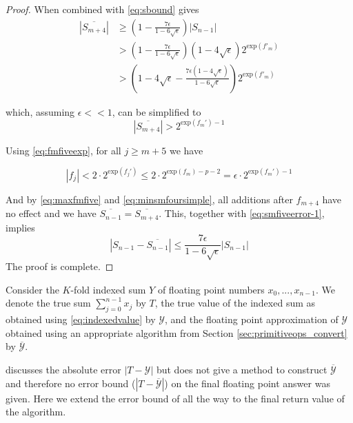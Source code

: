 \documentclass[12pt]{article}
\providecommand{\exp}{\ensuremath{\text{exp}}}
\theoremstyle{definition}
\numberwithin{equation}{section}
\numberwithin{figure}{section}
\begin{document}
\begin{proof}
      When combined with \eqref{eq:sbound} gives
      \begin{align*}
        \left|\overline{S_{m+4}}\right|
        & \geq \left(1-\frac{7 \epsilon}{1-6\sqrt{\epsilon}}\right) |S_{n-1}| \\
        & > \left(1-\frac{7 \epsilon}{1-6\sqrt{\epsilon}}\right) \left(1-4\sqrt{\epsilon}\right) 2^{\exp(f'_m)} \\
        & > \left(1-4\sqrt{\epsilon} - \frac{7 \epsilon \left(1-4\sqrt{\epsilon}\right)}{1-6\sqrt{\epsilon}}\right) 2^{\exp(f'_m)}
      \end{align*}

      which, assuming $\epsilon << 1$, can be simplified to
      \begin{equation}
        \left|\overline{S_{m + 4}}\right| > 2^{\exp(f_m') - 1}
        \label{eq:minsmfoursimple}
      \end{equation}

      Using  \eqref{eq:fmfiveexp}, for all $j \geq m + 5$ we have

      \begin{equation}
        |f_j| < 2 \cdot 2^{\exp(f_j')} \leq 2 \cdot 2^{\exp(f_m) - p - 2} = \epsilon \cdot 2^{\exp(f_m') - 1}
        \label{eq:maxfmfive}
      \end{equation}

      And by \eqref{eq:maxfmfive} and \eqref{eq:minsmfoursimple}, all additions after $f_{m + 4}$ have no effect and we have $\overline{S_{n-1}} = \overline{S_{m+4}}$.
      This, together with \eqref{eq:smfiveerror-1}, implies
      \begin{equation*}
        \left|S_{n-1} - \overline{S_{n-1}}\right| \leq \frac{7\epsilon}{1-6\sqrt{\epsilon}} |S_{n-1}|
      \end{equation*}
      The proof is complete.
    \end{proof}

    Consider the $K$-fold indexed sum $Y$ of floating point numbers $x_0, ..., x_{n - 1}$. We denote the true sum $\sum \limits_{j = 0}^{n - 1} x_j$ by $T$, the true value of the indexed sum as obtained using  \eqref{eq:indexedvalue} by $\mathcal{Y}$, and the floating point approximation of $\mathcal{Y}$ obtained using an appropriate algorithm from Section \ref{sec:primitiveops_convert} by $\overline{\mathcal{Y}}$.

    \cite{repsum} discusses the absolute error $|T - \mathcal{Y}|$ but does not give a method to construct $\overline{\mathcal{Y}}$ and therefore no error bound ($|T - \overline{\mathcal{Y}}|$) on the final floating point answer was given. Here we extend the error bound of \cite{repsum} all the way to the final return value of the algorithm.
\end{document}
